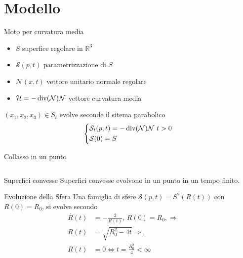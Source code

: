 \section{Modello}
\begin{frame}{Moto per curvatura media}
       \begin{itemize}
       \item $S$ superfice regolare in $\mathbb{R}^3$
       \item $\mathcal{S}(p,t)$ parametrizzazione di $S$
       \item $\mathcal{N}(x,t)$ vettore unitario normale regolare
       \item $\mathcal{H}=-\operatorname{div}(\mathcal{N})\mathcal{N}$ vettore curvatura media
       \end{itemize}
       $(x_1,x_2,x_3)\in S_t$ evolve seconde il sitema parabolico
       \[
       \left\{
       \begin{aligned}
         &\mathcal{S}_t(p,t)=-\operatorname{div}(\mathcal{N})\mathcal{N}\text{ $t>0$} \\
         &\mathcal{S}(0)=S
       \end{aligned}
       \right.
       \]
\end{frame}

\begin{frame}{Collasso in un punto}
  \begin{columns}[c]
    \begin{column}{6cm}
      \begin{block}{Superfici convesse}
       Superfici convesse  evolvono in un
       punto in un tempo finito.
       \end{block}
      \begin{exampleblock}{Evoluzione della Sfera}
        Una famiglia di sfere $\mathcal{S}(p,t)=S^2(R(t))$ con
        $R(0)=R_0$, si evolve secondo
        \[
        \begin{aligned}
          \overset{\displaystyle.}{R}(t) &= -\frac{2}{R(t)},\,
          R(0)=R_0,\Rightarrow\\
          R(t)&=\sqrt{R_0^2-4t}\Rightarrow, \\
          R(t)&=0 \Longleftrightarrow t=\frac{R_0^2}{4}<\infty 
        \end{aligned}
        \]
      \end{exampleblock}
    \end{column}
    \begin{column}[c]{4cm}
       \begin{center}
     \end{center}
    \end{column}
    \end{columns}
\end{frame}

